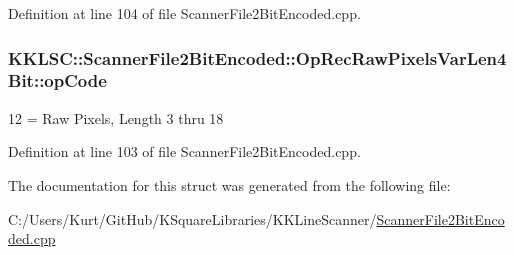 Definition at line 104 of file Scanner\+File2\+Bit\+Encoded.\+cpp.

\subsubsection[{\texorpdfstring{op\+Code}{opCode}}]{ K\+K\+L\+S\+C\+::\+Scanner\+File2\+Bit\+Encoded\+::\+Op\+Rec\+Raw\+Pixels\+Var\+Len4\+Bit\+::op\+Code}\hypertarget{struct_scanner_file2_bit_encoded_1_1_op_rec_raw_pixels_var_len4_bit_a23708979dbdba31a21c5312f39614653}{}\label{struct_scanner_file2_bit_encoded_1_1_op_rec_raw_pixels_var_len4_bit_a23708979dbdba31a21c5312f39614653}
12 = Raw Pixels, Length 3 thru 18 

Definition at line 103 of file Scanner\+File2\+Bit\+Encoded.\+cpp.



The documentation for this struct was generated from the following file\+:\begin{DoxyCompactItemize}
\item 
C\+:/\+Users/\+Kurt/\+Git\+Hub/\+K\+Square\+Libraries/\+K\+K\+Line\+Scanner/\hyperlink{_scanner_file2_bit_encoded_8cpp}{Scanner\+File2\+Bit\+Encoded.\+cpp}\end{DoxyCompactItemize}
